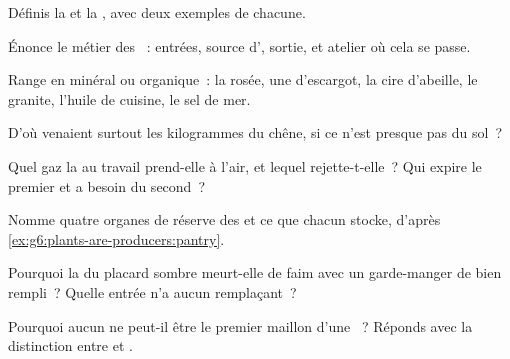 \begin{exercise}[$\star$]\label{exo:g6:plants-are-producers:1}
Définis la  et la , avec deux
exemples de chacune.
\end{exercise}

\begin{exercise}[$\star$]\label{exo:g6:plants-are-producers:2}
Énonce le métier des ~: entrées, source d',
sortie, et atelier où cela se passe.
\end{exercise}

\begin{exercise}[$\star$]\label{exo:g6:plants-are-producers:3}
Range en minéral ou organique~: la rosée, une  d'escargot,
la cire d'abeille, le granite, l'huile de cuisine, le sel de mer.
\end{exercise}

\begin{exercise}[$\star$]\label{exo:g6:plants-are-producers:4}
D'où venaient surtout les kilogrammes du chêne, si ce n'est presque
pas du sol~?
\end{exercise}

\begin{exercise}[$\star$]\label{exo:g6:plants-are-producers:5}
Quel gaz la  au travail prend-elle à l'air, et lequel
rejette-t-elle~? Qui expire le premier et a besoin du second~?
\end{exercise}

\begin{exercise}[$\star$]\label{exo:g6:plants-are-producers:6}
Nomme quatre organes de réserve des  et ce que chacun stocke,
d'après \cref{ex:g6:plants-are-producers:pantry}.
\end{exercise}

\begin{exercise}[$\star\star$]\label{exo:g6:plants-are-producers:7}
Pourquoi la  du placard sombre meurt-elle de faim avec un
garde-manger de  bien rempli~? Quelle entrée n'a aucun
remplaçant~?
\end{exercise}

\begin{exercise}[$\star\star$]\label{exo:g6:plants-are-producers:8}
Pourquoi aucun  ne peut-il être le premier maillon d'une
~? Réponds avec la distinction entre 
et .
\end{exercise}

